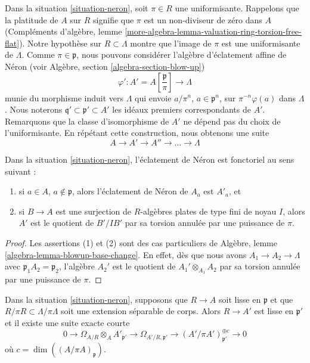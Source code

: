 \noindent
Dans la situation \ref{situation-neron}, soit $\pi \in R$ une uniformisante.
Rappelons que la platitude de $A$ sur $R$ signifie que $\pi$
est un non-diviseur de zéro dans $A$
(Compléments d'algèbre, lemme
\ref{more-algebra-lemma-valuation-ring-torsion-free-flat}).
Notre hypothèse sur $R \subset \Lambda$ montre que l'image de $\pi$
est une uniformisante de $\Lambda$. Comme $\pi \in \mathfrak p$, nous pouvons considérer
l'algèbre d'éclatement affine de Néron (voir
Algèbre, section \ref{algebra-section-blow-up})
$$
\varphi' :
A' = A[\textstyle{\frac{\mathfrak p}{\pi}}]
\longrightarrow
\Lambda
$$
munie du morphisme induit vers $\Lambda$ qui envoie
$a/\pi^n$, $a \in \mathfrak p^n$, sur $\pi^{-n}\varphi(a)$ dans $\Lambda$.
Nous noterons $\mathfrak q' \subset \mathfrak p' \subset A'$
les idéaux premiers correspondants de $A'$. Remarquons que la classe
d'isomorphisme de $A'$ ne dépend pas du choix de l'uniformisante.
En répétant cette construction, nous obtenons une suite
$$
A \to A' \to A'' \to \ldots \to \Lambda
$$

\begin{lemma}
\label{lemma-neron-functorial}
Dans la situation \ref{situation-neron}, l'éclatement de Néron est fonctoriel
au sens suivant :
\begin{enumerate}
\item si $a \in A$, $a \not \in \mathfrak p$, alors l'éclatement de Néron
de $A_a$ est $A'_a$, et
\item si $B \to A$ est une surjection de $R$-algèbres plates de type fini
de noyau $I$, alors $A'$ est le quotient de $B'/IB'$ par sa
torsion annulée par une puissance de $\pi$.
\end{enumerate}
\end{lemma}

\begin{proof}
Les assertions (1) et (2) sont des cas particuliers de
Algèbre, lemme \ref{algebra-lemma-blowup-base-change}.
En effet, dès que nous avons $A_1 \to A_2 \to \Lambda$ avec
$\mathfrak p_1 A_2 = \mathfrak p_2$, l'algèbre $A_2'$ est
le quotient de $A_1' \otimes_{A_1} A_2$ par sa torsion annulée par une puissance de $\pi$.
\end{proof}

\begin{lemma}
\label{lemma-neron-blowup-smooth}
Dans la situation \ref{situation-neron}, supposons que $R \to A$ soit lisse
en $\mathfrak p$ et que $R/\pi R \subset \Lambda/\pi \Lambda$
soit une extension séparable de corps. Alors $R \to A'$ est lisse en
$\mathfrak p'$ et il existe une suite exacte courte
$$
0 \to
\Omega_{A/R} \otimes_A A'_{\mathfrak p'} \to
\Omega_{A'/R, \mathfrak p'} \to
(A'/\pi A')_{\mathfrak p'}^{\oplus c} \to 0
$$
où $c = \dim((A/\pi A)_\mathfrak p)$.
\end{lemma}

